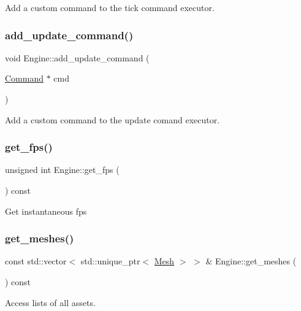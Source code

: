 Add a custom command to the tick command executor. \mbox{\label{class_engine_a50fc8b735ed53d1157316b35959cad00}} 
\subsubsection{\texorpdfstring{add\+\_\+update\+\_\+command()}{add\_update\_command()}}
{\footnotesize\ttfamily void Engine\+::add\+\_\+update\+\_\+command (\begin{DoxyParamCaption}\item[{\mbox{\hyperlink{class_command}{Command}} $\ast$}]{cmd }\end{DoxyParamCaption})}

Add a custom command to the update comand executor. \mbox{\label{class_engine_a9b33dc683a75b1a3deb14a7280003b38}} 
\subsubsection{\texorpdfstring{get\+\_\+fps()}{get\_fps()}}
{\footnotesize\ttfamily unsigned int Engine\+::get\+\_\+fps (\begin{DoxyParamCaption}{ }\end{DoxyParamCaption}) const}

Get instantaneous fps \mbox{\label{class_engine_a0cab1935798c43bd3a9f5ed3a4de1f04}} 
\subsubsection{\texorpdfstring{get\+\_\+meshes()}{get\_meshes()}}
{\footnotesize\ttfamily const std\+::vector$<$ std\+::unique\+\_\+ptr$<$ \mbox{\hyperlink{class_mesh}{Mesh}} $>$ $>$ \& Engine\+::get\+\_\+meshes (\begin{DoxyParamCaption}{ }\end{DoxyParamCaption}) const}

Access lists of all assets. \mbox{\label{class_engine_af92650e3ce3cabf7e527c92ae4917702}} 

